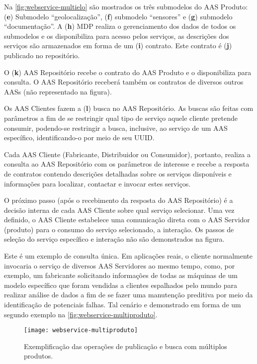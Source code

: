 Na \autoref{fig:webservice-multielo} são mostrados os três submodelos do AAS Produto: (\textbf{e}) Submodelo ``geolocalização'', (\textbf{f}) submodelo ``sensores'' e (\textbf{g}) submodelo ``documentação''. A (\textbf{h}) MDP realiza o gerenciamento dos dados de todos os submodelos e os disponibiliza para acesso pelos serviços, as descrições dos serviços são armazenados em forma de um (\textbf{i}) contrato. Este contrato é (\textbf{j}) publicado no repositório.

O (\textbf{k}) AAS Repositório recebe o contrato do AAS Produto e o disponibiliza para consulta. O AAS Repositório receberá também os contratos de diversos outros AASs (não representado na figura).

Os AAS Clientes fazem a (\textbf{l}) busca no AAS Repositório. As buscas são feitas com parâmetros a fim de se restringir qual tipo de serviço aquele cliente pretende consumir, podendo-se restringir a busca, inclusive, ao serviço de um AAS específico, identificando-o por meio de seu UUID.

Cada AAS Cliente (Fabricante, Distribuidor ou Consumidor), portanto, realiza a consulta ao AAS Repositório com os parâmetros de interesse e recebe a resposta de contratos contendo descrições detalhadas sobre os serviços disponíveis e informações para localizar, contactar e invocar estes serviços.

O próximo passo (após o recebimento da resposta do AAS Repositório) é a decisão interna de cada AAS Cliente sobre qual serviço selecionar. Uma vez definido, o AAS Cliente estabelece uma comunicação direta com o AAS Servidor (produto) para o consumo do serviço selecionado, a interação. Os passos de seleção do serviço específico e interação não são demonstrados na figura.

Este é um exemplo de consulta única. Em aplicações reais, o cliente normalmente invocaria o serviço de diversos AAS Servidores ao mesmo tempo, como, por exemplo, um fabricante solicitando informações de todas as máquinas de um modelo específico que foram vendidas a clientes espalhados pelo mundo para realizar análise de dados a fim de se fazer uma manutenção preditiva por meio da identificação de potenciais falhas. Tal cenário e demonstrado em forma de um segundo exemplo na \autoref{fig:webservice-multiproduto}.

\begin{figure}[htb]
	\centering
	\texttt{[image: webservice-multiproduto]}
	\caption{Exemplificação das operações de publicação e busca com múltiplos produtos.}
	\label{fig:webservice-multiproduto}
\end{figure}

